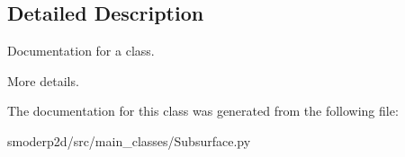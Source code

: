 \subsection{Detailed Description}
Documentation for a class. 

More details. 

The documentation for this class was generated from the following file\-:\begin{DoxyCompactItemize}
\item 
smoderp2d/src/main\-\_\-classes/Subsurface.\-py\end{DoxyCompactItemize}

